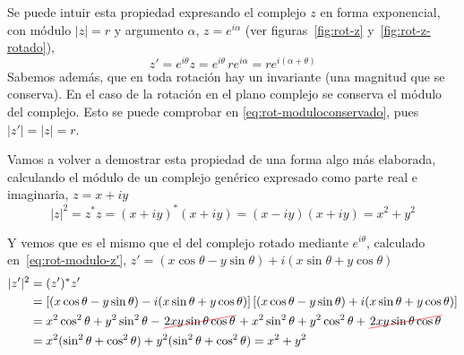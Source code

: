 Se puede intuir esta propiedad expresando el complejo $z$ en forma
exponencial, con módulo $|z| = r$ y argumento $\alpha$,
$z=e^{i\alpha}$ (ver figuras~\ref{fig:rot-z} y~\ref{fig:rot-z-rotado}),
\begin{equation}\label{eq:rot-moduloconservado}
  z' = e^{i\theta} z
  = e^{i\theta} \,re^{i\alpha}
  = r e^{i(\alpha+\theta)}
\end{equation}
Sabemos además, que en toda rotación hay un invariante (una magnitud que se
conserva). En el caso de la rotación en el plano complejo se conserva el módulo
del complejo. Esto se puede comprobar en \eqref{eq:rot-moduloconservado},
pues $|z'| = |z| = r$.

Vamos a volver a demostrar esta propiedad de una forma algo más elaborada,
calculando el módulo de un complejo genérico expresado como parte real e
imaginaria, $z = x + iy$
\[
  |z|^2 = z^* z = (x+iy)^* (x+iy) = (x-iy) (x+iy) = x^2 + y^2
\]

Y vemos que es el mismo que el del complejo rotado mediante $e^{i\theta}$,
calculado en~\eqref{eq:rot-modulo-z'},
$z'=(x\cos\theta-y\sin\theta) + i(x\sin\theta + y\cos\theta)$
{\small
\begin{align*}
  |z'|^2
  &= (z')^{*} z'\\
  &=
    \left[(x\cos\theta - y\sin\theta) - i(x\sin\theta + y\cos\theta)\right]
    \left[(x\cos\theta - y\sin\theta) + i(x\sin\theta + y\cos\theta)\right]\\
  &=
    x^2\cos^2\theta + y^2\sin^2\theta - \cancelout{2xy\sin\theta\cos\theta}
    +x^2\sin^2\theta + y^2\cos^2\theta + \cancelout{2xy\sin\theta\cos\theta}\\
  &=
    x^2 (\sin^2\theta + \cos^2\theta) + y^2 (\sin^2\theta + \cos^2\theta)
  =
    x^2 + y^2
\end{align*}
}

